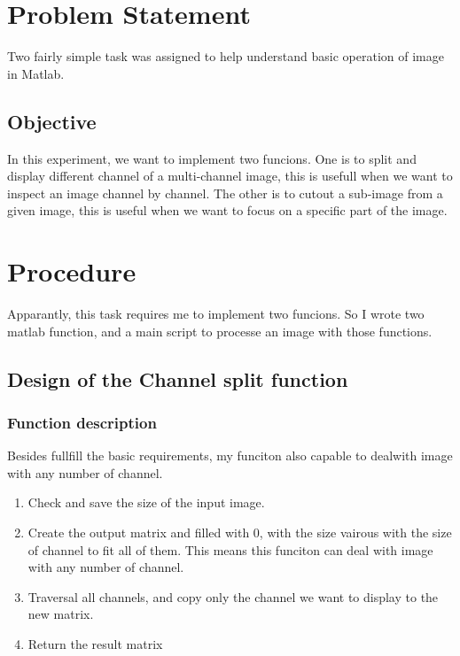 \documentclass[a4paper,11pt]{article}
\begin{document}
\thispagestyle{empty}

\blankpage

\tableofcontents
\blankpage

\section{Problem Statement}
Two fairly simple task was assigned to help understand basic operation of image in Matlab. \\
\subsection{Objective}
    In this experiment, we want to implement two funcions. One is to split and display different channel of a multi-channel image, this is usefull when we want to inspect an image channel by channel. The other is to cutout a sub-image from a given image, this is useful when we want to focus on a specific part of the image.\\

\section{Procedure}
Apparantly, this task requires me to implement two funcions. So I wrote two matlab function, and a main script to processe an image with those functions.

\subsection{Design of the Channel split function}
\subsubsection{Function description}
Besides fullfill the basic requirements, my funciton also capable to dealwith image with any number of channel.
\begin{enumerate}
    \item Check and save the size of the input image.
    \item Create the output matrix and filled with 0, with the size vairous with the size of channel to fit all of them. This means this funciton can deal with image with any number of channel.
    \item Traversal all channels, and copy only the channel we want to display to the new matrix.
    \item Return the result matrix
\end{enumerate}
\end{document}
